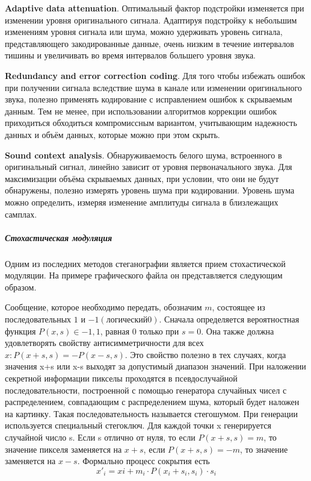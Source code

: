 \textbf{Adaptive data attenuation}. Оптимальный фактор подстройки изменяется
при изменении уровня оригинального сигнала. Адаптируя подстройку к небольшим
изменениям уровня сигнала или шума, можно удерживать уровень сигнала,
представляющего закодированные данные, очень низким в течение интервалов
тишины и увеличивать во время интервалов большего уровня звука.

\textbf{Redundancy and error correction coding}. Для того чтобы избежать
ошибок при получении сигнала вследствие шума в канале или изменении
оригинального звука, полезно применять кодирование с исправлением ошибок к
скрываемым данным. Тем не менее, при использовании алгоритмов коррекции
ошибок приходиться обходиться компромиссным вариантом, учитывающим надежность
данных и объём данных, которые можно при этом скрыть.

\textbf{Sound context analysis}. Обнаруживаемость белого шума, встроенного в
оригинальный сигнал, линейно зависит от уровня первоначального звука. Для
максимизации объёма скрываемых данных, при условии, что они не будут
обнаружены, полезно измерять уровень шума при кодировании. Уровень шума можно
определить, измеряя изменение амплитуды сигнала в близлежащих самплах.

\subparagraph{Стохастическая модуляция}

Одним из последних методов стеганографии является прием стохастической
модуляции. На примере графического файла он представляется следующим образом.

Сообщение, которое необходимо передать, обозначим $m$, состоящее из
последовательных $1$ и $-1(логический 0)$. Сначала определяется вероятностная
функция $P(x,s) \in {-1,1}$, равная $0$ только при $s=0$. Она также должна
удовлетворять свойству антисимметричности для всех $x: P(x+s,s)=-P(x-s,s)$.
Это свойство полезно в тех случаях, когда значения x+s или x-s выходят за
допустимый диапазон значений. При наложении секретной информации пикселы
проходятся в псевдослучайной последовательности, построенной с помощью
генератора случайных чисел с  распределением, совпадающим с распределением
шума, который будет наложен на  картинку. Такая последовательность называется
стегошумом. При генерации используется специальный стегоключ. Для каждой
точки x генерируется случайной число s. Если s отлично от нуля, то если
$P(x+s,s)=m$, то значение пикселя заменяется на $x+s$, если $P(x+s,s)=-m$, то
значение заменяется на $x-s$. Формально процесс сокрытия есть
\begin{equation}\label{eq:7_1}
x'_i=xi+m_i \cdot P(x_i+s_i,s_i)\cdot s_i
\end{equation}

